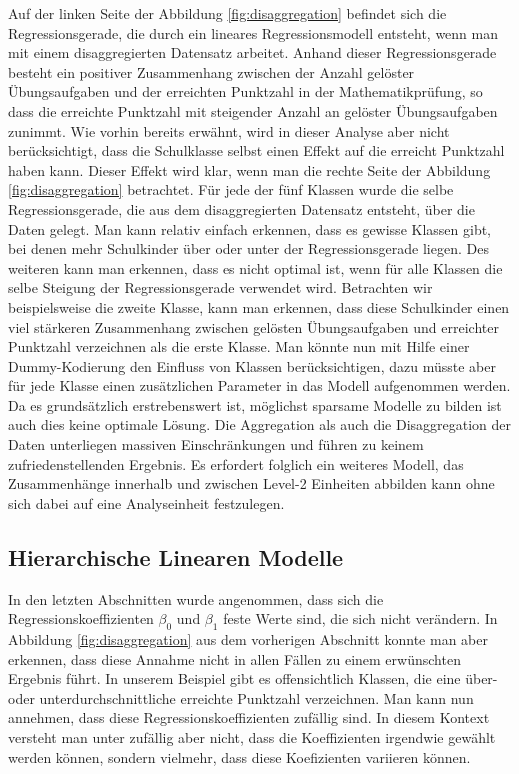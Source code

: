 \documentclass[12pt]{article}\usepackage[]{graphicx}\usepackage[]{color}
\numberwithin{equation}{section}
\begin{document}
Auf der linken Seite der Abbildung \ref{fig:disaggregation} befindet sich die Regressionsgerade, die durch ein lineares Regressionsmodell entsteht, wenn man mit einem disaggregierten Datensatz arbeitet. Anhand dieser Regressionsgerade besteht ein positiver Zusammenhang zwischen der Anzahl gelöster Übungsaufgaben und der erreichten Punktzahl in der Mathematikprüfung, so dass die erreichte Punktzahl mit steigender Anzahl an gelöster Übungsaufgaben zunimmt. Wie vorhin bereits erwähnt, wird in dieser Analyse aber nicht berücksichtigt, dass die Schulklasse selbst einen Effekt auf die erreicht Punktzahl haben kann. Dieser Effekt wird klar, wenn man die rechte Seite der Abbildung \ref{fig:disaggregation} betrachtet. Für jede der fünf Klassen wurde die selbe Regressionsgerade, die aus dem disaggregierten Datensatz entsteht, über die Daten gelegt. Man kann relativ einfach erkennen, dass es gewisse Klassen gibt, bei  denen mehr Schulkinder über oder unter der Regressionsgerade liegen. Des weiteren kann man erkennen, dass es nicht optimal ist, wenn für alle Klassen die selbe Steigung der Regressionsgerade verwendet wird. Betrachten wir beispielsweise die zweite Klasse, kann man erkennen, dass diese Schulkinder einen viel stärkeren Zusammenhang zwischen gelösten Übungsaufgaben und erreichter Punktzahl verzeichnen als die erste Klasse. Man könnte nun mit Hilfe einer Dummy-Kodierung den Einfluss von Klassen berücksichtigen, dazu müsste aber für jede Klasse einen zusätzlichen Parameter in das Modell aufgenommen werden. Da es grundsätzlich erstrebenswert ist, möglichst sparsame Modelle zu bilden ist auch dies keine optimale Lösung. Die Aggregation als auch die Disaggregation der Daten unterliegen massiven Einschränkungen und führen zu keinem zufriedenstellenden Ergebnis. Es erfordert folglich ein weiteres Modell, das Zusammenhänge innerhalb und zwischen Level-2 Einheiten abbilden kann ohne sich dabei auf eine Analyseinheit festzulegen.

\subsection{Hierarchische Linearen Modelle}
In den letzten Abschnitten wurde angenommen, dass sich die Regressionskoeffizienten $\beta_0$ und $\beta_1$ feste Werte sind, die sich nicht verändern. In Abbildung \ref{fig:disaggregation} aus dem vorherigen Abschnitt konnte man aber erkennen, dass diese Annahme nicht in allen Fällen zu einem erwünschten Ergebnis führt. In unserem Beispiel gibt es offensichtlich Klassen, die eine über- oder unterdurchschnittliche erreichte Punktzahl verzeichnen. Man kann nun annehmen, dass diese Regressionskoeffizienten zufällig sind. In diesem Kontext versteht man unter zufällig aber nicht, dass die Koeffizienten irgendwie gewählt werden können, sondern vielmehr, dass diese Koefizienten variieren können. 
\end{document}
